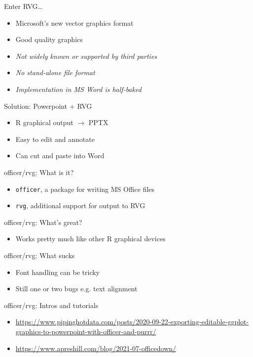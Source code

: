 \documentclass[aspectratio=169,12pt]{beamer} %
\begin{document}
\begin{frame}{Enter RVG\dots}
	\begin{itemize}
		\item Microsoft's new vector graphics format
		\item Good quality graphics
		\item \emph{Not widely known or supported by third parties}
		\item \emph{No stand-alone file format}
		\item \emph{Implementation in MS Word is half-baked}
	\end{itemize}
\end{frame}

\begin{frame}{Solution: Powerpoint + RVG}
	\begin{itemize}
		\item R graphical output $\rightarrow$ PPTX
		\item Easy to edit and annotate
		\item Can cut and paste into Word
	\end{itemize}
\end{frame}

\begin{frame}{officer/rvg: What is it?}
	\begin{itemize}
		\item \texttt{officer}, a package for writing MS Office files
		\item \texttt{rvg}, additional support for output to RVG
	\end{itemize}
\end{frame}

\begin{frame}{officer/rvg: What's great?}
	\begin{itemize}
		\item Works pretty much like other R graphical devices
	\end{itemize}
\end{frame}

\begin{frame}{officer/rvg: What sucks}
	\begin{itemize}
		\item Font handling can be tricky
		\item Still one or two bugs e.g. text alignment
	\end{itemize}
\end{frame}

\begin{frame}{officer/rvg: Intros and tutorials}
	\begin{itemize}
		\item \scriptsize{\url{https://www.pipinghotdata.com/posts/2020-09-22-exporting-editable-ggplot-graphics-to-powerpoint-with-officer-and-purrr/}}
		\item \scriptsize{\url{https://www.apreshill.com/blog/2021-07-officedown/}}
	\end{itemize}
\end{frame}
\end{document}
